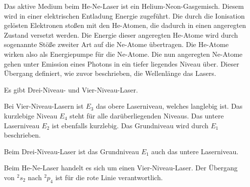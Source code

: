 

Das aktive Medium beim He-Ne-Laser ist ein Helium-Neon-Gasgemisch. Diesem wird in einer elektrischen Entladung Energie zugeführt. Die durch die Ionisation gelösten Elektronen stoßen mit den He-Atomen, die dadurch in einen angeregten Zustand versetzt werden. Die Energie dieser angeregten He-Atome wird durch sogenannte Stöße zweiter Art auf die Ne-Atome übertragen. Die He-Atome wirken also als Energiepumpe für die Ne-Atome. Die nun angeregten Ne-Atome gehen unter Emission eines Photons in ein tiefer liegendes Niveau über. Dieser Übergang definiert, wie zuvor beschrieben, die Wellenlänge das Lasers.



Es gibt Drei-Niveau- und Vier-Niveau-Laser.

Bei Vier-Niveau-Lasern ist $E_3$ das obere Laserniveau, welches langlebig ist. Das kurzlebige Niveau $E_4$ steht für alle darüberliegenden Niveaus. Das untere Laserniveau $E_2$ ist ebenfalls kurzlebig. Das Grundniveau wird durch $E_1$ beschrieben.

Beim Drei-Niveau-Laser ist das Grundniveau $E_1$ auch das untere Laserniveau. 


Beim He-Ne-Laser handelt es sich um einen Vier-Niveau-Laser.
Der Übergang von $^2s_2$ nach $^2p_4$ ist für die rote Linie verantwortlich.



